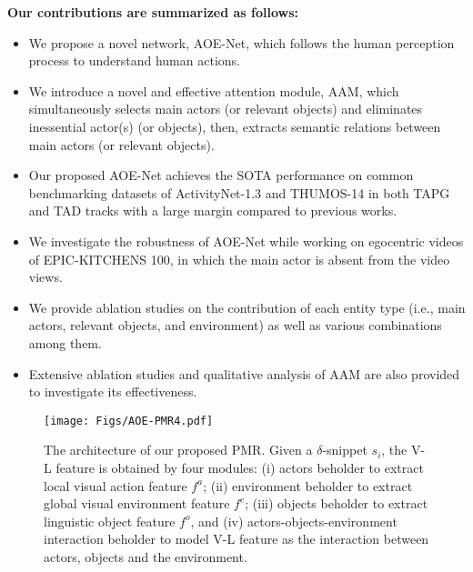 \documentclass[sn-mathphys]{sn-jnl}
\theoremstyle{thmstyleone}\newtheorem{theorem}{Theorem}\newtheorem{proposition}[theorem]{Proposition}
\theoremstyle{thmstyletwo}\newtheorem{example}{Example}\newtheorem{remark}{Remark}
\theoremstyle{thmstylethree}\newtheorem{definition}{Definition}
\begin{document}
\noindent\textbf{Our contributions are summarized as follows:}
\begin{itemize} \item We propose a novel network, AOE-Net, which follows the human perception process to understand human actions.
    \item We introduce a novel and effective attention module, AAM, which simultaneously selects main actors (or relevant objects) and eliminates inessential actor(s) (or objects), then, extracts semantic relations between main actors (or relevant objects).
    \item Our proposed AOE-Net achieves the SOTA performance on common benchmarking datasets of ActivityNet-1.3 and THUMOS-14 in both TAPG and TAD tracks with a large margin compared to previous works.
    \item We investigate the robustness of AOE-Net while working on egocentric videos of EPIC-KITCHENS 100, in which the main actor is absent from the video views.
    \item We provide ablation studies on the contribution of each entity type (i.e., main actors, relevant objects, and environment) as well as various combinations among them.
    \item Extensive ablation studies and qualitative analysis of AAM are also provided to investigate its effectiveness.
\end{itemize}

\begin{figure*}[t]
\centering
  \texttt{[image: Figs/AOE-PMR4.pdf]}
  \caption{The architecture of our proposed PMR. Given a $\delta$-snippet $s_i$, the V-L feature is obtained by four modules: (i) actors beholder to extract local visual action feature $f^a$; (ii) environment beholder to extract global visual environment feature $f^e$; (iii) objects beholder to extract linguistic object feature $f^o$, and (iv) actors-objects-environment interaction beholder to model V-L feature as the interaction between actors, objects and the environment.}
  \label{fig:AOE-PMR}
\end{figure*}
\end{document}
